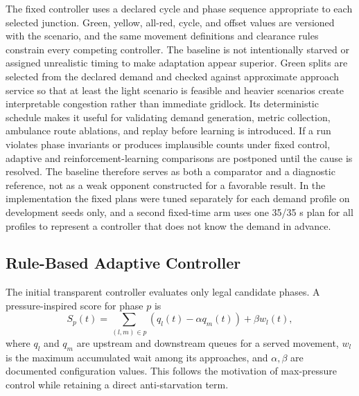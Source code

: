 The fixed controller uses a declared cycle and phase sequence appropriate to each selected junction. Green, yellow, all-red, cycle, and offset values are versioned with the scenario, and the same movement definitions and clearance rules constrain every competing controller. The baseline is not intentionally starved or assigned unrealistic timing to make adaptation appear superior. Green splits are selected from the declared demand and checked against approximate approach service so that at least the light scenario is feasible and heavier scenarios create interpretable congestion rather than immediate gridlock. Its deterministic schedule makes it useful for validating demand generation, metric collection, ambulance route ablations, and replay before learning is introduced. If a run violates phase invariants or produces implausible counts under fixed control, adaptive and reinforcement-learning comparisons are postponed until the cause is resolved. The baseline therefore serves as both a comparator and a diagnostic reference, not as a weak opponent constructed for a favorable result. In the implementation the fixed plans were tuned separately for each demand profile on development seeds only, and a second fixed-time arm uses one 35/35 s plan for all profiles to represent a controller that does not know the demand in advance.

\subsection{Rule-Based Adaptive Controller}

The initial transparent controller evaluates only legal candidate phases. A pressure-inspired score for phase $p$ is
\begin{equation}
S_p(t)=\sum_{(l,m)\in p}\left(q_l(t)-\alpha q_m(t)\right)+\beta w_l(t),
\label{eq:rule-score}
\end{equation}
where $q_l$ and $q_m$ are upstream and downstream queues for a served movement, $w_l$ is the maximum accumulated wait among its approaches, and $\alpha,\beta$ are documented configuration values. This follows the motivation of max-pressure control \cite{varaiya2013maxpressure} while retaining a direct anti-starvation term.

